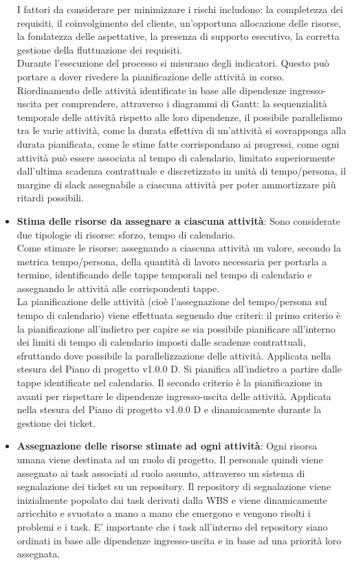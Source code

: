 \begin{itemize}
     I fattori da considerare per minimizzare i rischi includono: la completezza dei requisiti, il coinvolgimento del cliente, un'opportuna allocazione delle risorse, la fondatezza delle aspettative, la presenza di supporto esecutivo, la corretta gestione della fluttuazione dei requisiti.\\
     Durante l'esecuzione del processo si misurano degli indicatori. Questo può portare a dover rivedere la pianificazione delle attività in corso. \\
     Riordinamento delle attività identificate in base alle dipendenze ingresso-uscita per comprendere, attraverso i diagrammi di Gantt: la sequenzialità temporale delle attività rispetto alle loro dipendenze, il possibile parallelismo tra le varie attività, come la durata effettiva di un'attività si sovrapponga alla durata pianificata, come le stime fatte corrispondano ai progressi, come ogni attività può essere associata al tempo di calendario, limitato superiormente dall'ultima scadenza contrattuale e discretizzato in unità di tempo/persona, il margine di slack assegnabile a ciascuna attività per poter ammortizzare più ritardi possibili.
    \item \textbf{Stima delle risorse da assegnare a ciascuna attività}: Sono considerate due tipologie di risorse: sforzo, tempo di calendario. \\
     Come stimare le risorse: assegnando a ciascuna attività un valore, secondo la metrica tempo/persona, della quantità di lavoro necessaria per portarla a termine, identificando delle tappe temporali nel tempo di calendario e assegnando le attività alle corrispondenti tappe.\\
     La pianificazione delle attività (cioè l'assegnazione del tempo/persona sul tempo di calendario) viene effettuata seguendo due criteri: il primo criterio è la pianificazione all'indietro per capire se sia possibile pianificare all'interno dei limiti di tempo di calendario imposti dalle scadenze contrattuali, sfruttando dove possibile la parallelizzazione delle attività. Applicata nella stesura del Piano di progetto v1.0.0 D. Si pianifica all'indietro a partire dalle tappe identificate nel calendario. Il secondo criterio è la pianificazione in avanti per rispettare le dipendenze ingresso-uscita delle attività. Applicata nella stesura del Piano di progetto v1.0.0 D e dinamicamente durante la gestione dei ticket.
    \item \textbf{Assegnazione delle risorse stimate ad ogni attività}: Ogni risorsa umana viene destinata ad un ruolo di progetto. Il personale quindi viene assegnato ai task associati al ruolo assunto, attraverso un sistema di segnalazione dei ticket su un repository\glo. Il repository di segnalazione viene inizialmente popolato dai task derivati dalla WBS e viene dinamicamente arricchito e svuotato a mano a mano che emergono e vengono risolti i problemi e i task. E' importante che i task all'interno del repository siano ordinati in base alle dipendenze ingresso-uscita e in base ad una priorità loro assegnata.
\end{itemize}

